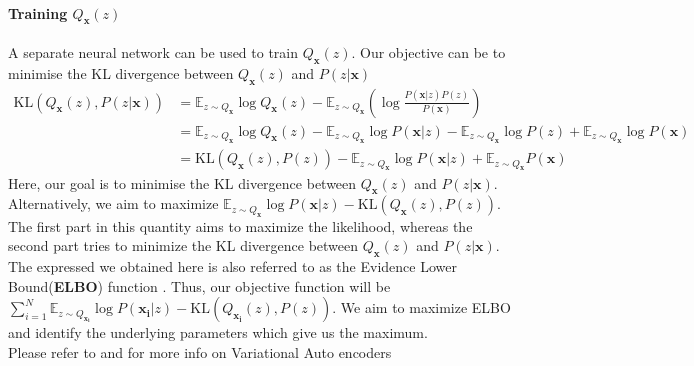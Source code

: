 \documentclass[12pt]{article}
\begin{document}
\paragraph{Training $Q_{\mathbf{x}}(z)$} A separate neural network can be used to train $Q_{\mathbf{x}}(z)$. 
Our objective can be to minimise the KL divergence between $Q_{\mathbf{x}}(z)$ and $P(z|\mathbf{x})$
\begin{align*}
    \mathrm{KL}(Q_{\mathbf{x}}(z), P(z|\mathbf{x})) &=  \mathbb{E}_{z \sim Q_{\mathbf{x}}}\log{Q_{\mathbf{x}}(z)} - \mathbb{E}_{z \sim Q_{\mathbf{x}}}\left(\log\frac{P(\mathbf{x}|z)P(z)}{P(\mathbf{x})}\right)\\
    &= \mathbb{E}_{z \sim Q_{\mathbf{x}}}\log Q_{\mathbf{x}}(z) - \mathbb{E}_{z \sim Q_{\mathbf{x}}}\log P(\mathbf{x}|z) - \mathbb{E}_{z \sim Q_{\mathbf{x}}}\log P(z) + \mathbb{E}_{z \sim Q_{\mathbf{x}}}\log P(\mathbf{x})\\
    &= \mathrm{KL}(Q_{\mathbf{x}}(z), P(z)) - \mathbb{E}_{z \sim Q_{\mathbf{x}}}\log{P(\mathbf{x}|z)} + \mathbb{E}_{z \sim Q_{\mathbf{x}}}P(\mathbf{x})
\end{align*}
Here, our goal is to minimise the KL divergence between $Q_{\mathbf{x}}(z)$ and $P(z|\mathbf{x})$. Alternatively, we aim to maximize $\mathbb{E}_{z \sim Q_{\mathbf{x}}}\log{P(\mathbf{x}|z)} - \mathrm{KL}(Q_{\mathbf{x}}(z), P(z))$. The first part in this quantity aims to maximize the likelihood, whereas the second part tries to minimize the KL divergence between $Q_{\mathbf{x}}(z)$ and $P(z|\mathbf{x})$. The expressed we obtained here is also referred to as the Evidence Lower Bound(\textbf{ELBO}) function \cite{ELBO}. 
Thus, our objective function will be $\sum_{i=1}^{N}\mathbb{E}_{z \sim Q_{\mathbf{x_{i}}}}\log{P(\mathbf{x_{i}}|z)} - \mathrm{KL}(Q_{\mathbf{x_{i}}}(z), P(z))$. We aim to maximize ELBO and identify the underlying parameters which give us the maximum.\\


Please refer to \cite{VAET} and \cite{VAE} for more info on Variational Auto encoders



\end{document}
